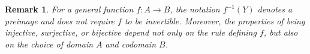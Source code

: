 \documentclass[12pt]{article}
\newtheorem*{remark}{Remark}
\begin{document}
\begin{remark}
For a general function $f : A \to B$, the notation $f^{-1}(Y)$ denotes a \emph{preimage} and does not require $f$ to be invertible.
Moreover, the properties of being injective, surjective, or bijective depend not only on the rule defining $f$,
but also on the choice of domain $A$ and codomain $B$.
\end{remark}
\end{document}
